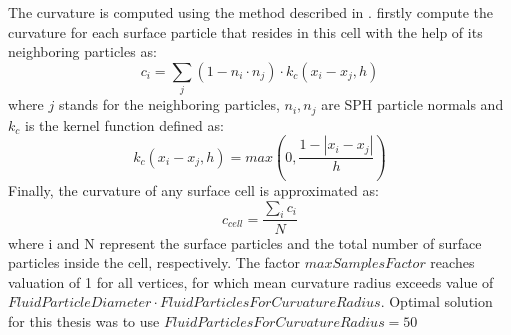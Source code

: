 The curvature is computed using the method described in \cite{CurvatureComputation}. firstly compute the curvature for each surface particle that resides in this cell with the help of its neighboring particles as:
\begin{equation}
	c_i = \sum_j{(1 - n_i \cdot n_j)\cdot k_c(x_i-x_j, h)}
\end{equation}
where $j$ stands for the neighboring particles, $n_i, n_j$ are SPH particle normals and
$k_c$ is the kernel function defined as:
\begin{equation}
	k_c(x_i-x_j, h) = max\left(0, \dfrac{1 - |x_i - x_j|}{h}\right)
\end{equation}
Finally, the curvature of any surface cell is approximated as:
\begin{equation}
	c_{cell} = \dfrac{\sum_i{c_i}}{N}
\end{equation}
where i and N represent the surface particles and the total number of surface particles inside the cell, respectively. The factor $maxSamplesFactor$ reaches valuation of 1 for all vertices, for which mean curvature radius exceeds value of $FluidParticleDiameter \cdot FluidParticlesForCurvatureRadius$. Optimal solution for this thesis was to use $FluidParticlesForCurvatureRadius=50$

